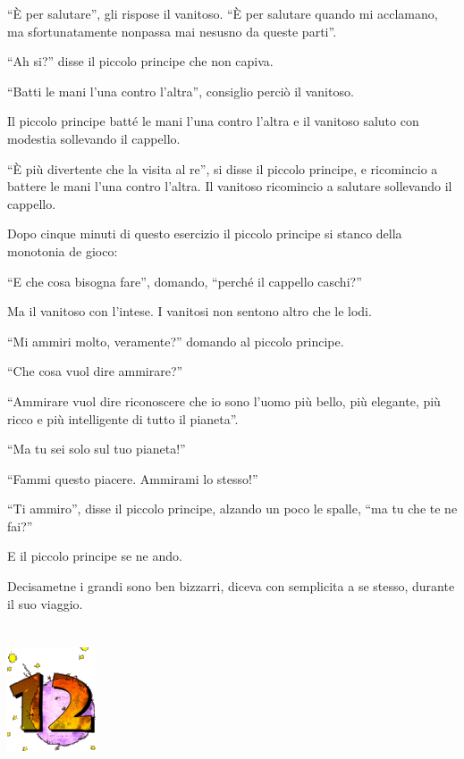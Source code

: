 \documentclass[11pt]{scrbook}
\begin{document}
``È per salutare'', gli rispose il vanitoso. ``È per salutare quando mi
acclamano, ma sfortunatamente nonpassa mai nesusno da queste parti''.

``Ah si?'' disse il piccolo principe che non capiva.

``Batti le mani l'una contro l'altra'', consiglio perciò il vanitoso.

Il piccolo principe batté le mani l'una contro l'altra e il vanitoso
saluto con modestia sollevando il cappello.

``È più divertente che la visita al re'', si disse il piccolo principe,
e ricomincio a battere le mani l'una contro l'altra. Il vanitoso
ricomincio a salutare sollevando il cappello.

Dopo cinque minuti di questo esercizio il piccolo principe si stanco
della monotonia de gioco:

``E che cosa bisogna fare'', domando, ``perché il cappello caschi?''

Ma il vanitoso con l'intese. I vanitosi non sentono altro che le lodi.

``Mi ammiri molto, veramente?'' domando al piccolo principe.

``Che cosa vuol dire ammirare?''

``Ammirare vuol dire riconoscere che io sono l'uomo più bello, più
elegante, più ricco e più intelligente di tutto il pianeta''.

``Ma tu sei solo sul tuo pianeta!''

``Fammi questo piacere. Ammirami lo stesso!''

``Ti ammiro'', disse il piccolo principe, alzando un poco le spalle,
``ma tu che te ne fai?''

E il piccolo principe se ne ando.

Decisametne i grandi sono ben bizzarri, diceva con semplicita a se
stesso, durante il suo viaggio.

\chapter{}
\begin{center}
\includegraphics{img/chapter12}
\end{center}
\end{document}
